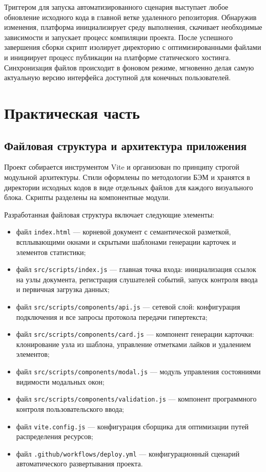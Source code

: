 \documentclass[bachelor, och, pract, times]{SCWorks}
\begin{document}
Триггером для запуска автоматизированного сценария выступает любое обновление
исходного кода в главной ветке удаленного репозитория. Обнаружив изменения,
платформа инициализирует среду выполнения, скачивает необходимые зависимости и
запускает процесс компиляции проекта. После успешного завершения сборки скрипт
изолирует директорию с оптимизированными файлами и инициирует процесс
публикации на платформе статического хостинга. Синхронизация файлов происходит
в фоновом режиме, мгновенно делая самую актуальную версию интерфейса доступной
для конечных пользователей.

\section{Практическая часть}
\subsection{Файловая структура и архитектура приложения}
Проект собирается инструментом Vite и организован по принципу строгой модульной
архитектуры. Стили оформлены по методологии БЭМ и хранятся в директории
исходных кодов в виде отдельных файлов для каждого визуального блока. Скрипты
разделены на компонентные модули.

Разработанная файловая структура включает следующие элементы:
\begin{itemize}
    \item файл \texttt{index.html} — корневой документ с семантической
      разметкой, всплывающими окнами и скрытыми шаблонами генерации карточек и
      элементов статистики;
    \item файл \texttt{src/scripts/index.js} — главная точка входа:
      инициализация ссылок на узлы документа, регистрация слушателей событий,
      запуск контроля ввода и первичная загрузка данных;
    \item файл \texttt{src/scripts/components/api.js} — сетевой слой:
      конфигурация подключения и все запросы протокола передачи гипертекста;
    \item файл \texttt{src/scripts/components/card.js} — компонент генерации
      карточки: клонирование узла из шаблона, управление отметками лайков и
      удалением элементов;
    \item файл \texttt{src/scripts/components/modal.js} — модуль управления
      состояниями видимости модальных окон;
    \item файл \texttt{src/scripts/components/validation.js} — компонент
      программного контроля пользовательского ввода;
    \item файл \texttt{vite.config.js} — конфигурация сборщика для оптимизации
      путей распределения ресурсов;
    \item файл \texttt{.github/workflows/deploy.yml} — конфигурационный
      сценарий автоматического развертывания проекта.
\end{itemize}
\end{document}
